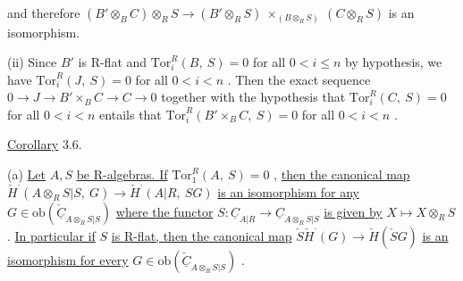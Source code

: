and therefore $(B'\otimes_B C)\otimes_R S \to (B'\otimes_R S)\ \times_{(B\otimes_R S)}\ (C \otimes_R S)$  is an isomorphism.

(ii)  Since  $B'$  is R-flat and  $\mathrm{Tor}^R_i(B,\ S) = 0$  for all  $0 < i \leq n$   by hypothesis, we have  $\mathrm{Tor}^R_i(J,\ S) = 0$  for all  $0 < i < n$  . Then the exact sequence  $0 \to J \to B'\times_B C \to C \to 0$  together with the hypothesis that  $\mathrm{Tor}^R_i(C,\ S) = 0$  for all  $0 < i < n$  entails that  $\mathrm{Tor}^R_i(B'\times_B C,\ S) = 0$  for all  $0 < i < n$  .


\underline{Corollary} 3.6.

(a)  \underline{Let}  $A, S$  \underline{be R-algebras. If}  $\mathrm{Tor}^R_1(A,\ S) = 0$  , \underline{then the canonical map}  $\check{H}^{\cdot}(A\otimes_R S|S,\ G) \to \check{H}^{\cdot}(A|R,\ SG)$  \underline{is an isomorphism for any}  $G \in \mathrm{ob}(\check{\underline{C}}_{A\otimes_R S|S})$  \underline{where the functor}  $S : \underline{C}_{A|R} \to \underline{C}_{A\otimes_R S|S}$  \underline{is given by}  $X \longmapsto X\otimes_R S$  . \underline{In particular if}  $S$  \underline{is R-flat, then the canonical map}  $\check{S}\check{H}^{\cdot}(G) \to \check{H}(\check{S}G)$  \underline{is an isomorphism for every}  $G \in \mathrm{ob}(\check{\underline{C}}_{A\otimes_R S|S})$  .

